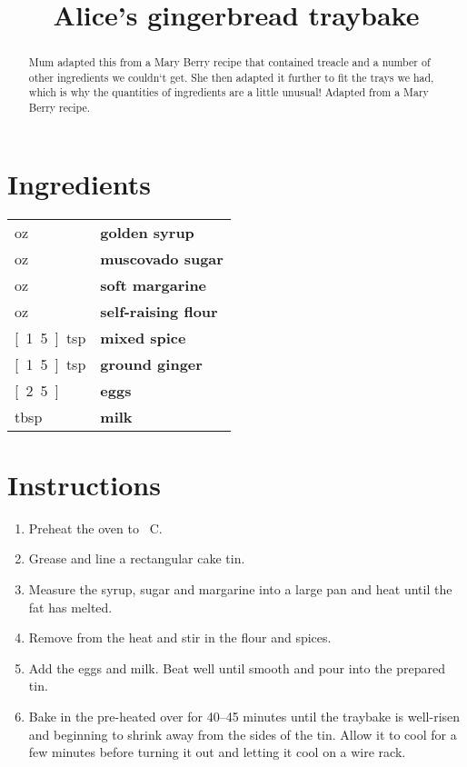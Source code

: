 \documentclass[main.tex]{subfiles}
\title{Alice's gingerbread traybake}
\begin{document}
\maketitle%

\begin{abstract}
 Mum adapted this from a Mary Berry recipe that contained treacle and a number of other ingredients we couldn`t get. She then adapted it further to fit the trays we had, which is why the quantities of ingredients are a little unusual!
\linebreak
Adapted from a Mary Berry recipe.
\end{abstract}

\section{Ingredients}

\vspace*{-\baselineskip}
\begin{table}[ht]
	\begin{tabularx}{\textwidth}{>{\hsize=0.333\hsize}X>{\bf\hsize=1\hsize}X}
	\unit[12]{oz} & golden syrup\\
	\unit[6]{oz} & muscovado sugar\\
	\unit[6]{oz} & soft margarine\\
	\unit[10]{oz} & self-raising flour \\
	\unit[1.5]{tsp} & mixed spice\\
	\unit[1.5]{tsp} & ground ginger\\
	\unit[2.5]{} & eggs \\
	\unit[3]{tbsp} & milk\\
	\end{tabularx}
\end{table}

\section{Instructions}

\begin{enumerate}
    \item Preheat the oven to \unit[160]{\textdegree C}.
    \item Grease and line a rectangular cake tin.
    \item Measure the syrup, sugar and margarine into a large pan and heat until the fat has melted.
    
    \item Remove from the heat and stir in the flour and spices.
    \item Add the eggs and milk. Beat well until smooth and pour into the prepared tin. 
    \item Bake in the pre-heated over for 40--45 minutes until the traybake is well-risen and beginning to shrink away from the sides of the tin. Allow it to cool for a few minutes before turning it out and letting it cool on a wire rack. 
	
\end{enumerate}

\end{document}
